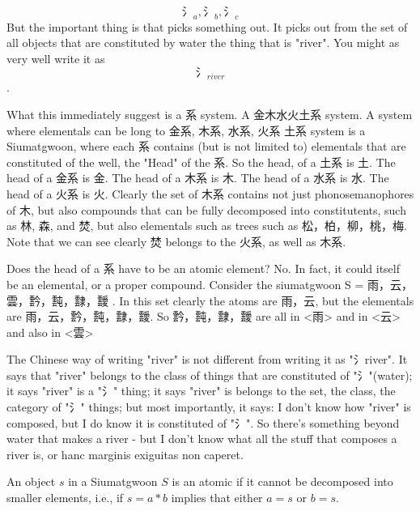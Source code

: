 $$\text{氵}_{a},\text{氵}_b,\text{氵}_c$$
But the important thing is that picks something out. It picks out from the set of all objects that are constituted by water the thing that is "river". You might as very well write it as $$\text{氵}_{river}$$. 

What this immediately suggest is a 系 system. A 金木水火土系 system. A system where elementals can be long to 金系, 木系, 水系, 火系 土系 system is a Siumatgwoon, where each 系 contains (but is not limited to) elementals that are constituted of the well, the "Head" of the 系. So the head, of a 土系 is 土. The head of a 金系 is 金. The head of a 木系 is 木. The head of a 水系 is 水. The head of a 火系 is 火. Clearly the set of 木系 contains not just phonosemanophores of 木, but also compounds that can be fully decomposed into constitutents, such as 林, 森, and 焚, but also elementals such as trees such as 松，柏，柳，桃，梅. Note that we can see clearly 焚 belongs to the 火系, as well as 木系. 

Does the head of a 系 have to be an atomic element? No. In fact, it could itself be an elemental, or a proper compound. Consider the siumatgwoon S = {雨，云，雲，霒，霕，霴，靉} . In this set clearly the atoms are {雨，云}, but the elementals are  {雨，云，霒，霕，霴，靉}. So {霒，霕，霴，靉} are all in <雨> and in <云> and also in <雲> 








The Chinese way of writing "river" is not different from writing it as "氵river". It says that "river" belongs to the class of things that are constituted of "氵"(water); it says "river" is a "氵" thing; it says "river" is belongs to the set, the class, the category of "氵" things; but most importantly, it says: I don't know how "river" is composed, but I do know it is constituted of "氵". So there's something beyond water that makes a river - but I don't know what all the stuff that composes a river is, or hanc marginis exiguitas non caperet.







\begin{definition}[Atomics]\label{def:atomics}
    An object $s$ in a Siumatgwoon $S$ is an atomic if it cannot be decomposed into smaller elements, i.e., if $s = a * b$ implies that either $a = s$ or $b = s$.
\end{definition}




